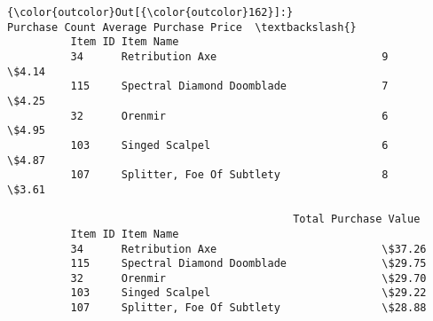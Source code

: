 \documentclass[11pt]{article}
\begin{document}
\begin{Verbatim}[commandchars=\\\{\}]
{\color{outcolor}Out[{\color{outcolor}162}]:}                                     Purchase Count Average Purchase Price  \textbackslash{}
          Item ID Item Name                                                           
          34      Retribution Axe                          9                  \$4.14   
          115     Spectral Diamond Doomblade               7                  \$4.25   
          32      Orenmir                                  6                  \$4.95   
          103     Singed Scalpel                           6                  \$4.87   
          107     Splitter, Foe Of Subtlety                8                  \$3.61   
          
                                             Total Purchase Value  
          Item ID Item Name                                        
          34      Retribution Axe                          \$37.26  
          115     Spectral Diamond Doomblade               \$29.75  
          32      Orenmir                                  \$29.70  
          103     Singed Scalpel                           \$29.22  
          107     Splitter, Foe Of Subtlety                \$28.88  
\end{Verbatim}
            

    
    
    
    
\end{document}
